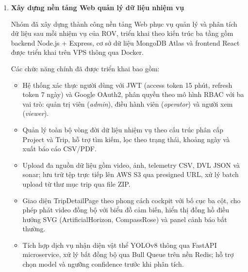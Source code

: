 \documentclass[../DoAn.tex]{subfiles}
\begin{document}
\begin{enumerate}
\begin{itemize}
    \item Nhận dữ liệu từ cảm biến DVL để hiển thị vận tốc và vị trí tương đối của robot theo thời gian thực.
    
    \item Điều khiển các cơ cấu chấp hành như đèn chiếu sáng, camera tilt, tay gắp và cấu hình động cơ.
    
    \item Hỗ trợ ghi lại toàn bộ dữ liệu phát sinh trong quá trình vận hành phục vụ lưu trữ và phân tích sau nhiệm vụ.
\end{itemize}

Phần mềm GCS hiện đóng vai trò giao diện điều khiển trung tâm, đảm bảo khả năng giám sát trực quan và điều khiển robot theo thời gian thực.

\item \textbf{Xây dựng nền tảng Web quản lý dữ liệu nhiệm vụ}

Nhóm đã xây dựng thành công nền tảng Web phục vụ quản lý và phân tích dữ liệu sau mỗi nhiệm vụ của ROV, triển khai theo kiến trúc ba tầng gồm backend Node.js + Express, cơ sở dữ liệu MongoDB Atlas và frontend React được triển khai trên VPS thông qua Docker.

Các chức năng chính đã được triển khai bao gồm:

\begin{itemize}
    \item Hệ thống xác thực người dùng với JWT (access token 15 phút, refresh token 7 ngày) và Google OAuth2, phân quyền theo mô hình RBAC với ba vai trò: quản trị viên (\textit{admin}), điều hành viên (\textit{operator}) và người xem (\textit{viewer}).

    \item Quản lý toàn bộ vòng đời dữ liệu nhiệm vụ theo cấu trúc phân cấp Project và Trip, hỗ trợ tìm kiếm, lọc theo trạng thái, khoảng ngày và xuất báo cáo CSV/PDF.

    \item Upload đa nguồn dữ liệu gồm video, ảnh, telemetry CSV, DVL JSON và sonar; lưu trữ tệp trực tiếp lên AWS S3 qua presigned URL, xử lý batch upload từ thư mục trip qua file ZIP.

    \item Giao diện TripDetailPage theo phong cách cockpit với bố cục ba cột, cho phép phát video đồng bộ với biểu đồ cảm biến, hiển thị đồng hồ điều hướng SVG (ArtificialHorizon, CompassRose) và panel cảnh báo bất thường.

    \item Tích hợp dịch vụ nhận diện vật thể YOLOv8 thông qua FastAPI microservice, xử lý bất đồng bộ qua Bull Queue trên nền Redis; hỗ trợ chọn model và ngưỡng confidence trước khi phân tích.


\end{itemize}
\end{enumerate}
\end{document}
